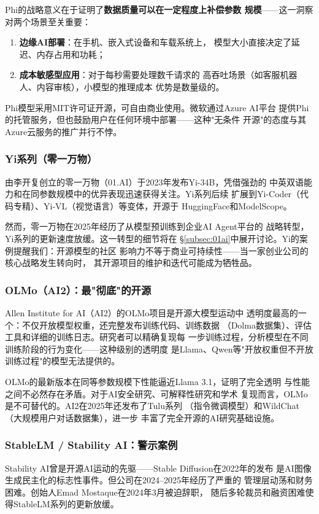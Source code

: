 Phi的战略意义在于证明了\textbf{数据质量可以在一定程度上补偿参数
规模}——这一洞察对两个场景至关重要：
\begin{enumerate}
  \item \textbf{边缘AI部署}：在手机、嵌入式设备和车载系统上，
    模型大小直接决定了延迟、内存占用和功耗；
  \item \textbf{成本敏感型应用}：对于每秒需要处理数千请求的
    高吞吐场景（如客服机器人、内容审核），小模型的推理成本
    优势是数量级的。
\end{enumerate}

Phi模型采用MIT许可证开源，可自由商业使用。微软通过Azure AI平台
提供Phi的托管服务，但也鼓励用户在任何环境中部署——这种"无条件
开源"的态度与其Azure云服务的推广并行不悖。

\subsubsection{Yi系列（零一万物）}
由李开复创立的零一万物（01.AI）于2023年发布Yi-34B，凭借强劲的
中英双语能力和在同参数规模中的优异表现迅速获得关注。Yi系列后续
扩展到Yi-Coder（代码专精）、Yi-VL（视觉语言）等变体，开源于
HuggingFace和ModelScope。

然而，零一万物在2025年经历了从模型预训练到企业AI Agent平台的
战略转型，Yi系列的更新速度放缓。这一转型的细节将在
§\ref{subsec:01ai}中展开讨论。Yi的案例提醒我们：开源模型的社区
影响力不等于商业可持续性——当一家创业公司的核心战略发生转向时，
其开源项目的维护和迭代可能成为牺牲品。

\subsubsection{OLMo（AI2）：最"彻底"的开源}
Allen Institute for AI（AI2）的OLMo项目是开源大模型运动中
透明度最高的一个：不仅开放模型权重，还完整发布训练代码、训练数据
（Dolma数据集）、评估工具和详细的训练日志。研究者可以精确复现每
一步训练过程，分析模型在不同训练阶段的行为变化——这种级别的透明度
是Llama、Qwen等"开放权重但不开放训练过程"的模型无法提供的。

OLMo的最新版本在同等参数规模下性能逼近Llama 3.1，证明了完全透明
与性能之间不必然存在矛盾。对于AI安全研究、可解释性研究和学术
复现而言，OLMo是不可替代的。AI2在2025年还发布了Tulu系列
（指令微调模型）和WildChat（大规模用户对话数据集），进一步
丰富了完全开源的AI研究基础设施。

\subsubsection{StableLM / Stability AI：警示案例}
Stability AI曾是开源AI运动的先驱——Stable Diffusion在2022年的发布
是AI图像生成民主化的标志性事件。但公司在2024--2025年经历了严重的
管理层动荡和财务困难。创始人Emad Mostaque在2024年3月被迫辞职，
随后多轮裁员和融资困难使得StableLM系列的更新放缓。

